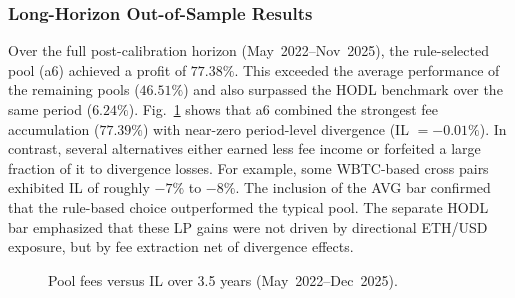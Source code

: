 \documentclass[journal]{IEEEtran}
\begin{document}
\subsubsection{Long-Horizon Out-of-Sample Results}
Over the full post-calibration horizon (May~2022--Nov~2025), the rule-selected pool (a6) achieved a profit of $77.38\%$. 
This exceeded the average performance of the remaining pools ($46.51\%$) and also surpassed the HODL benchmark over the same period ($6.24\%$). 
Fig.~\ref{fig:post_contrib} shows that a6 combined the strongest fee accumulation ($77.39\%$) with near-zero period-level divergence (IL $=-0.01\%$). 
In contrast, several alternatives either earned less fee income or forfeited a large fraction of it to divergence losses. 
For example, some WBTC-based cross pairs exhibited IL of roughly $-7\%$ to $-8\%$. 
The inclusion of the AVG bar confirmed that the rule-based choice outperformed the typical pool. 
The separate HODL bar emphasized that these LP gains were not driven by directional ETH/USD exposure, but by fee extraction net of divergence effects.


\begin{figure}[t]
\centering
{}
\caption{Pool fees versus IL over 3.5 years (May~2022--Dec~2025).}
\label{fig:post_contrib}
\end{figure}
\end{document}
